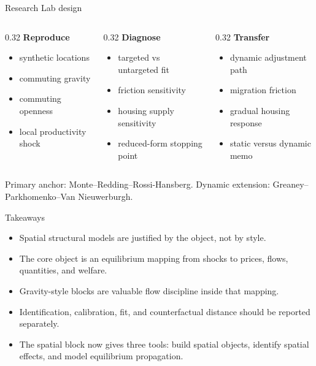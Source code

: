 \documentclass[aspectratio=169,11pt]{beamer}
\newcommand{\1}{\mathbf{1}}
\begin{document}
\begin{frame}{Research Lab design}
\begin{columns}[T,onlytextwidth]
\begin{column}{0.32\linewidth}
\textbf{Reproduce}
\begin{itemize}
    \item synthetic locations
    \item commuting gravity
    \item commuting openness
    \item local productivity shock
\end{itemize}
\end{column}
\begin{column}{0.32\linewidth}
\textbf{Diagnose}
\begin{itemize}
    \item targeted vs untargeted fit
    \item friction sensitivity
    \item housing supply sensitivity
    \item reduced-form stopping point
\end{itemize}
\end{column}
\begin{column}{0.32\linewidth}
\textbf{Transfer}
\begin{itemize}
    \item dynamic adjustment path
    \item migration friction
    \item gradual housing response
    \item static versus dynamic memo
\end{itemize}
\end{column}
\end{columns}

\medskip
\small
Primary anchor: Monte--Redding--Rossi-Hansberg. Dynamic extension: Greaney--Parkhomenko--Van Nieuwerburgh.
\end{frame}

\begin{frame}{Takeaways}
\begin{itemize}
    \item Spatial structural models are justified by the object, not by style.
    \item The core object is an equilibrium mapping from shocks to prices, flows, quantities, and welfare.
    \item Gravity-style blocks are valuable flow discipline inside that mapping.
    \item Identification, calibration, fit, and counterfactual distance should be reported separately.
    \item The spatial block now gives three tools: build spatial objects, identify spatial effects, and model equilibrium propagation.
\end{itemize}
\end{frame}
\end{document}
